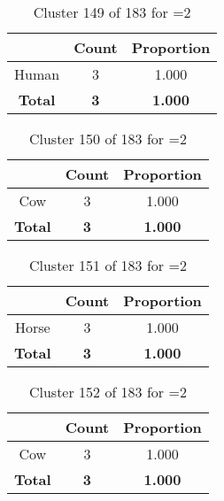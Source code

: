 \begin{table}[ht!]
\centering
\begin{tabular}{|c|c|c|}
\hline
\bf \Spec{} &\bf Count &\bf Proportion\\ \hline \hline
Human & 3 & 1.000\\ \hline
\hline
\bf Total & \bf 3 & \bf 1.000\\ \hline
\end{tabular}
\label{tab:cluster:149:2}
\caption{Cluster 149 of 183 for \minneigh{}=2}
\end{table}

\clearpage
\begin{table}[ht!]
\centering
\begin{tabular}{|c|c|c|}
\hline
\bf \Spec{} &\bf Count &\bf Proportion\\ \hline \hline
Cow & 3 & 1.000\\ \hline
\hline
\bf Total & \bf 3 & \bf 1.000\\ \hline
\end{tabular}
\label{tab:cluster:150:2}
\caption{Cluster 150 of 183 for \minneigh{}=2}
\end{table}

\begin{table}[ht!]
\centering
\begin{tabular}{|c|c|c|}
\hline
\bf \Spec{} &\bf Count &\bf Proportion\\ \hline \hline
Horse & 3 & 1.000\\ \hline
\hline
\bf Total & \bf 3 & \bf 1.000\\ \hline
\end{tabular}
\label{tab:cluster:151:2}
\caption{Cluster 151 of 183 for \minneigh{}=2}
\end{table}

\begin{table}[ht!]
\centering
\begin{tabular}{|c|c|c|}
\hline
\bf \Spec{} &\bf Count &\bf Proportion\\ \hline \hline
Cow & 3 & 1.000\\ \hline
\hline
\bf Total & \bf 3 & \bf 1.000\\ \hline
\end{tabular}
\label{tab:cluster:152:2}
\caption{Cluster 152 of 183 for \minneigh{}=2}
\end{table}

